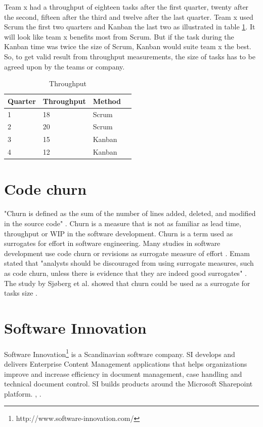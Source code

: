 \documentclass[UKenglish]{ifimaster}  %
\begin{document}
Team x had a throughput of eighteen tasks after the first quarter, twenty after the second, fifteen after the third and twelve after the last quarter. Team x used Scrum the first two quarters and Kanban the last two as illustrated in table \ref{tt}. It will look like team x benefits most from Scrum. But if the task during the Kanban time was twice the size of Scrum, Kanban would suite team x the best. So, to get valid result from throughput measurements, the size of tasks has to be agreed upon by the teams or company.
\begin{table}[ht]
\begin{center}
    \begin{tabular}{| l | l | l | l |}
    \hline
    Quarter & Throughput & Method\\ \hline
    1 & 18 & Scrum\\ \hline
    2 & 20 & Scrum \\ \hline
    3 & 15 & Kanban\\ \hline
    4 & 12 & Kanban\\ \hline
    \end{tabular}
\caption{Throughput}
\label{tt} %
\end{center}
\end{table}

\section{Code churn}
\label{sec:Churn}
"Churn is defined as the sum of the number of lines added, deleted, and modified in the source code" \parencite{Dag}.
Churn is a measure that is not as familiar as lead time, throughput or WIP in the software development. Churn is a term used as surrogates for effort in software engineering. Many studies in software development use code churn or revisions as surrogate measure of effort \parencite{yamashita2012quantifying}. Emam stated that "analysts should be discouraged from using surrogate measures, such as code churn, unless there is evidence that they are indeed good surrogates" \parencite{el2000methodology}. The study by Sj\o berg et al. showed that churn could be used as a surrogate for tasks size \parencite{yamashita2012quantifying}. 


\section{Software Innovation}
\label{sec:SI}
Software Innovation\footnote{http://www.software-innovation.com/} is a Scandinavian software company. SI develops and delivers Enterprise Content Management applications that helps organizations improve and increase efficiency in document management, case handling and technical document control. SI builds products around the Microsoft Sharepoint platform. \parencite{Dag}, \parencite{SI}.
\end{document}
